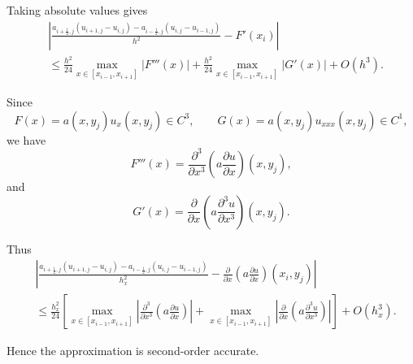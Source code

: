 \documentclass{ctexart}
\begin{document}
\begin{solution}
  Taking absolute values gives
  \[
    \begin{aligned}
      &
      \left|
      \frac{
        a_{i+\frac12,j}(u_{i+1,j}-u_{i,j})
        -
        a_{i-\frac12,j}(u_{i,j}-u_{i-1,j})
      }{h^2}
      -
      F'(x_i)
      \right|
      \\
      &\le
      \frac{h^2}{24}
      \max_{x\in[x_{i-1},x_{i+1}]}
      |F'''(x)|
      +
      \frac{h^2}{24}
      \max_{x\in[x_{i-1},x_{i+1}]}
      |G'(x)|
      +
      O(h^3).
    \end{aligned}
  \]

  Since
  \[
    F(x)=a(x,y_j)u_x(x,y_j) \in C^3,
    \qquad
    G(x)=a(x,y_j)u_{xxx}(x,y_j) \in C^1,
  \]
  we have
  \[
    F'''(x)
    =
    \frac{\partial^3}{\partial x^3}
    \left(
      a\frac{\partial u}{\partial x}
    \right)(x,y_j),
  \]
  and
  \[
    G'(x)
    =
    \frac{\partial}{\partial x}
    \left(
      a\frac{\partial^3u}{\partial x^3}
    \right)(x,y_j).
  \]

  Thus
  \[
    \begin{aligned}
      &
      \left|
      \frac{
        a_{i+\frac12,j}(u_{i+1,j}-u_{i,j})
        -
        a_{i-\frac12,j}(u_{i,j}-u_{i-1,j})
      }{h_x^2}
      -
      \frac{\partial}{\partial x}
      \left(
        a\frac{\partial u}{\partial x}
      \right)(x_i,y_j)
      \right|
      \\
      &\le
      \frac{h_x^2}{24}
      \left[
        \max_{x\in[x_{i-1},x_{i+1}]}
        \left|
        \frac{\partial^3}{\partial x^3}
        \left(
          a\frac{\partial u}{\partial x}
        \right)
        \right|
        +
        \max_{x\in[x_{i-1},x_{i+1}]}
        \left|
        \frac{\partial}{\partial x}
        \left(
          a\frac{\partial^3u}{\partial x^3}
        \right)
        \right|
      \right]
      +
      O(h_x^3).
    \end{aligned}
  \]

  Hence the approximation is second-order accurate.
\end{solution}
\end{document}
